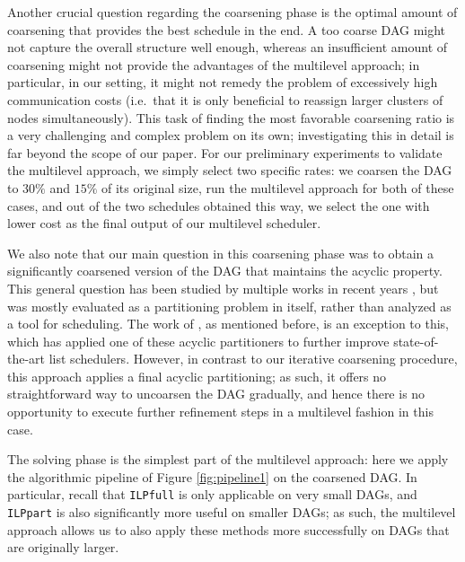 \documentclass[sigconf,nonacm]{acmart}
\begin{document}
Another crucial question regarding the coarsening phase is the optimal amount of coarsening that provides the best schedule in the end. A too coarse DAG might not capture the overall structure well enough, whereas an insufficient amount of coarsening might not provide the advantages of the multilevel approach; in particular, in our setting, it might not remedy the problem of excessively high communication costs (i.e.\ that it is only beneficial to reassign larger clusters of nodes simultaneously). This task of finding the most favorable coarsening ratio is a very challenging and complex problem on its own; investigating this in detail is far beyond the scope of our paper. For our preliminary experiments to validate the multilevel approach, we simply select two specific rates: we coarsen the DAG to $30\%$ and $15\%$ of its original size, run the multilevel approach for both of these cases, and out of the two schedules obtained this way, we select the one with lower cost as the final output of our multilevel scheduler.

We also note that our main question in this coarsening phase was to obtain a significantly coarsened version of the DAG that maintains the acyclic property. This general question has been studied by multiple works in recent years \cite{DAGpart, DAH}, but was mostly evaluated as a partitioning problem in itself, rather than analyzed as a tool for scheduling. The work of \cite{SPD}, as mentioned before, is an exception to this, which has applied one of these acyclic partitioners to further improve state-of-the-art list schedulers. However, in contrast to our iterative coarsening procedure, this approach applies a final acyclic partitioning; as such, it offers no straightforward way to uncoarsen the DAG gradually, and hence there is no opportunity to execute further refinement steps in a multilevel fashion in this case.

The solving phase is the simplest part of the multilevel approach: here we apply the algorithmic pipeline of Figure \ref{fig:pipeline1} on the coarsened DAG. In particular, recall that \texttt{ILPfull} is only applicable on very small DAGs, and \texttt{ILPpart} is also significantly more useful on smaller DAGs; as such, the multilevel approach allows us to also apply these methods more successfully on DAGs that are originally larger.
\end{document}
